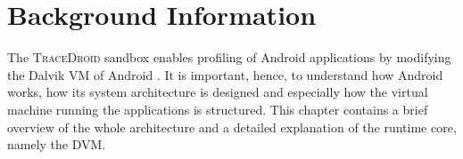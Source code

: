 \chapter{Background Information}
\label{chap:background}

The \textsc{TraceDroid} sandbox enables profiling of Android applications by
modifying the Dalvik VM of Android \cite{ref1}. It is important, hence, to
understand how Android works, how its system architecture is designed
and especially how the virtual machine running the applications is
structured. This chapter contains a brief overview of the whole
architecture and a detailed explanation of the runtime core, namely
the DVM.
